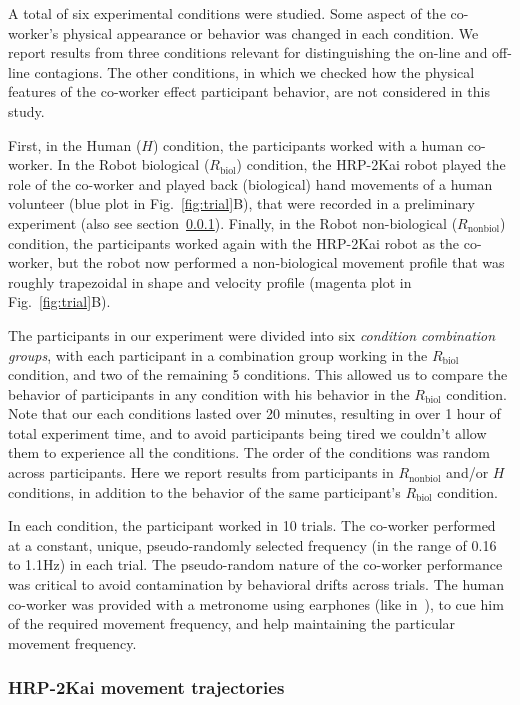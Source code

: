 A total of six experimental conditions were studied. Some aspect of the co-worker's physical appearance or behavior was changed in each condition. We report results from three conditions relevant for distinguishing the on-line and off-line contagions. The other conditions, in which we checked how the physical features of the co-worker effect participant behavior, are not considered in this study.

First, in the Human ($H$) condition, the participants worked with a human co-worker. In the Robot biological ($R_{\text{biol}}$) condition, the HRP-2Kai robot played the role of the co-worker and played back (biological) hand movements of a human volunteer (blue plot in Fig.~\ref{fig:trial}B), that were recorded in a preliminary experiment (also see section~\ref{hrpTraj}). Finally, in the Robot non-biological ($R_{\text{nonbiol}}$) condition, the participants worked again with the HRP-2Kai robot as the co-worker, but the robot now performed a non-biological movement profile that was roughly trapezoidal in shape and velocity profile (magenta plot in Fig.~\ref{fig:trial}B). 

The participants in our experiment were divided into six \emph{condition combination groups}, with each participant in a combination group working in the  $R_{\text{biol}}$ condition, and two of the remaining 5 conditions. This allowed us to compare the behavior of participants in any condition with his behavior in the $R_{\text{biol}}$ condition. Note that our each conditions lasted over 20 minutes, resulting in over 1 hour of total experiment time, and to avoid participants being tired we couldn't allow them to experience all the conditions. The order of the conditions was random across participants. Here we report results from participants in $R_{\text{nonbiol}}$ and/or $H$ conditions, in addition to the behavior of the same participant's $R_{\text{biol}}$ condition.

In each condition, the participant worked in 10 trials. The co-worker performed at a constant, unique, pseudo-randomly selected frequency (in the range of 0.16 to 1.1Hz) in each trial. The pseudo-random nature of the co-worker performance was critical to avoid contamination by behavioral drifts across trials. The human co-worker was provided with a metronome using earphones (like in~\cite{Bisio:PlosOne:2014}), to cue him of the required movement frequency, and help maintaining the particular movement frequency.

\subsubsection{HRP-2Kai movement trajectories} \label{hrpTraj}

